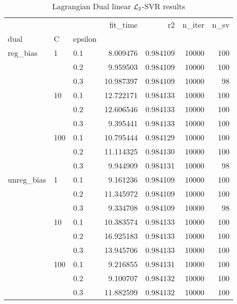 \begin{table}[H]
\centering
\caption{Lagrangian Dual linear $\protect \mathcal{L}_2$-SVR results}
\label{linear_lagrangian_dual_l2_svr_cv_results}
\begin{tabular}{lllrrrr}
\toprule
           &     &     &   fit\_time &        r2 &  n\_iter &  n\_sv \\
dual & C & epsilon &            &           &         &       \\
\midrule
reg\_bias & 1   & 0.1 &   8.009476 &  0.984109 &   10000 &   100 \\
           &     & 0.2 &   9.959503 &  0.984109 &   10000 &   100 \\
           &     & 0.3 &  10.987397 &  0.984109 &   10000 &    98 \\
           & 10  & 0.1 &  12.722171 &  0.984133 &   10000 &   100 \\
           &     & 0.2 &  12.606546 &  0.984133 &   10000 &   100 \\
           &     & 0.3 &   9.395441 &  0.984133 &   10000 &   100 \\
           & 100 & 0.1 &  10.795444 &  0.984129 &   10000 &   100 \\
           &     & 0.2 &  11.114325 &  0.984130 &   10000 &   100 \\
           &     & 0.3 &   9.944909 &  0.984131 &   10000 &    98 \\
unreg\_bias & 1   & 0.1 &   9.161236 &  0.984109 &   10000 &   100 \\
           &     & 0.2 &  11.345972 &  0.984109 &   10000 &   100 \\
           &     & 0.3 &   9.334708 &  0.984109 &   10000 &    98 \\
           & 10  & 0.1 &  10.383574 &  0.984133 &   10000 &   100 \\
           &     & 0.2 &  16.925183 &  0.984133 &   10000 &   100 \\
           &     & 0.3 &  13.945706 &  0.984133 &   10000 &   100 \\
           & 100 & 0.1 &   9.216855 &  0.984131 &   10000 &   100 \\
           &     & 0.2 &   9.100707 &  0.984132 &   10000 &   100 \\
           &     & 0.3 &  11.882599 &  0.984132 &   10000 &   100 \\
\bottomrule
\end{tabular}
\end{table}
